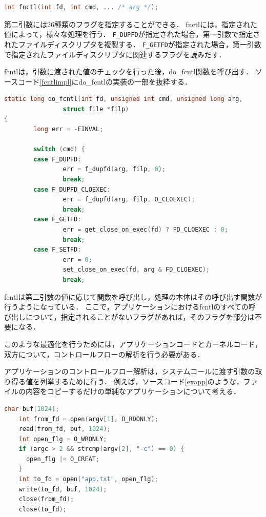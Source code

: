 \documentclass[graduation-thesis]{mlarticle}
\begin{document}
\begin{lstlisting}[language=C, caption=fcntlシステムコールのシグネチャ, label=fcntlsig]
  int fnctl(int fd, int cmd, ... /* arg */);
\end{lstlisting}

第二引数には26種類のフラグを指定することができる．
fnctlには，指定された値によって，様々な処理を行う．
\texttt{F\_DUPFD}が指定された場合，第一引数で指定されたファイルディスクリプタを複製する．
\texttt{F\_GETFD}が指定された場合，第一引数で指定されたファイルディスクリプタに関連するフラグを読みだす．

fcntlは，引数に渡された値のチェックを行った後，do\_fcntl関数を呼び出す．
ソースコード\ref{fcntlimpl}にdo\_fcntlの実装の一部を抜粋する．

\begin{lstlisting}[language=C, caption=do\_fcntlの実装(抜粋), label=fcntlimpl]
static long do_fcntl(int fd, unsigned int cmd, unsigned long arg,
                struct file *filp)
{
        long err = -EINVAL;

        switch (cmd) {
        case F_DUPFD:
                err = f_dupfd(arg, filp, 0);
                break;
        case F_DUPFD_CLOEXEC:
                err = f_dupfd(arg, filp, O_CLOEXEC);
                break;
        case F_GETFD:
                err = get_close_on_exec(fd) ? FD_CLOEXEC : 0;
                break;
        case F_SETFD:
                err = 0;
                set_close_on_exec(fd, arg & FD_CLOEXEC);
                break;
\end{lstlisting}

fcntlは第二引数の値に応じて関数を呼び出し，処理の本体はその呼び出す関数が行うようになっている．
ここで，アプリケーションにおけるfcntlのすべての呼び出しについて，指定されることがないフラグがあれば，そのフラグを部分は不要になる．

このような最適化を行うためには，アプリケーションコードとカーネルコード，双方について，コントロールフローの解析を行う必要がある．

アプリケーションのコントロールフロー解析は，システムコールに渡す引数の取り得る値を列挙するために行う．
例えば，ソースコード\ref{exapp}のような，ファイルの内容をコピーするだけの単純なアプリケーションについて考える．

\begin{lstlisting}[language=C, caption=アプリケーションの例, label=exapp]
    char buf[1024];
    int from_fd = open(argv[1], O_RDONLY);
    read(from_fd, buf, 1024);
    int open_flg = O_WRONLY;
    if (argc > 2 && strcmp(argv[2], "-c") == 0) {
      open_flg |= O_CREAT;
    }
    int to_fd = open("app.txt", open_flg);
    write(to_fd, buf, 1024);
    close(from_fd);
    close(to_fd);
\end{lstlisting}
\end{document}
